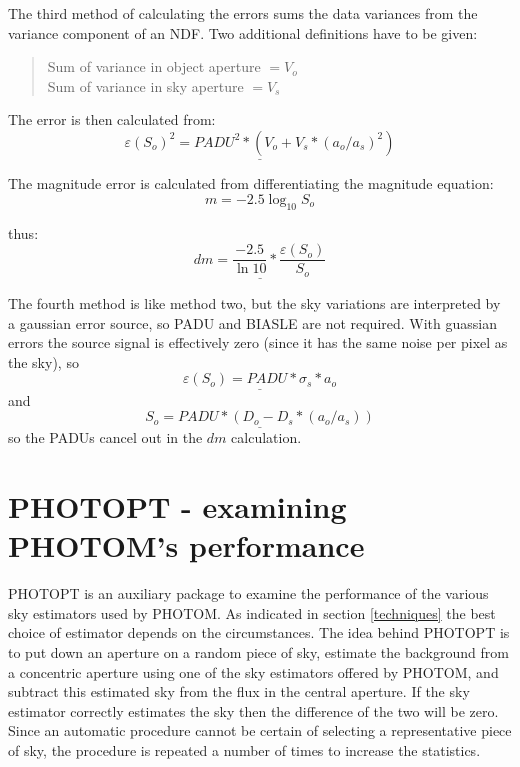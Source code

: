 \documentclass[twoside,11pt]{article}
\newcommand{\xlabel}[1]{}
\renewcommand{\_}{\texttt{\symbol{95}}}
\begin{document}
The third method of calculating the errors sums the data variances from
the variance component of an NDF. Two additional definitions
have to be given:

\begin{quote}
Sum of variance in object aperture       $= V_o$\\
Sum of variance in sky aperture          $= V_s$
\end{quote}

The error is then calculated from:
\begin{equation}\underline{
\varepsilon( S_o )^2 = PADU^2 * ( V_o + V_s * ( a_o / a_s )^2 )
}\end{equation}

The magnitude error is calculated from differentiating the magnitude equation:
\[m=-2.5\log_{10}S_o\]

thus:
\[\underline{dm=\frac{-2.5}{\ln10}*\frac{\varepsilon(S_o)}{S_o}}\]

The fourth method is like method two, but the sky variations are
interpreted by a gaussian error source, so PADU and BIASLE are not
required. With guassian errors the source signal is effectively zero
(since it has the same noise per pixel as the sky), so 
\begin{equation}\underline{
\varepsilon( S_o ) = PADU * \sigma_s * a_o
}\end{equation}
and
\begin{equation}\underline{
S_o = PADU * ( D_o - D_s * ( a_o / a_s ) )
}\end{equation}
so the PADUs cancel out in the $dm$ calculation.


\section{PHOTOPT \xlabel{PHOTOPT}- examining PHOTOM's performance}

PHOTOPT is an auxiliary package to examine the performance of the various
sky estimators used by PHOTOM. As indicated in section \ref{techniques} the
best choice of estimator depends on the circumstances.
The idea behind PHOTOPT is to put down an aperture on a random piece of sky,
estimate the background from a concentric aperture using one of the sky
estimators offered by PHOTOM, and subtract this estimated sky from the
flux in the central aperture. If the sky estimator correctly estimates
the sky then the difference of the two will be zero. Since an automatic
procedure cannot be certain of selecting a representative piece of sky,
the procedure is repeated a number of times to increase the statistics.
\end{document}
